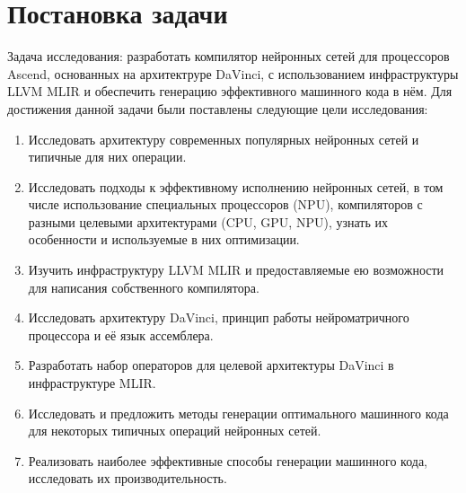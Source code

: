 \section{Постановка задачи}
\label{sec:Chapter1} 

Задача исследования: разработать компилятор нейронных сетей для процессоров
Ascend, основанных на архитектруре DaVinci, с использованием инфраструктуры
LLVM MLIR и обеспечить генерацию эффективного машинного кода в нём.
Для достижения данной задачи были поставлены следующие цели исследования:

\begin{enumerate}
    \item Исследовать архитектуру современных популярных нейронных сетей
          и типичные для них операции.
    \item Исследовать подходы к эффективному исполнению нейронных сетей,
          в том числе использование специальных процессоров (NPU),
          компиляторов с разными целевыми архитектурами (CPU, GPU, NPU),
          узнать их особенности и используемые в них оптимизации.
    \item Изучить инфраструктуру LLVM MLIR и предоставляемые ею возможности
          для написания собственного компилятора.
    \item Исследовать архитектуру DaVinci, принцип работы нейроматричного
          процессора и её язык ассемблера.
    \item Разработать набор операторов для целевой архитектуры DaVinci в
          инфраструктуре MLIR.
    \item Исследовать и предложить методы генерации оптимального машинного
          кода для некоторых типичных операций нейронных сетей.
    \item Реализовать наиболее эффективные способы генерации машинного кода,
          исследовать их производительность.
\end{enumerate}

\newpage
